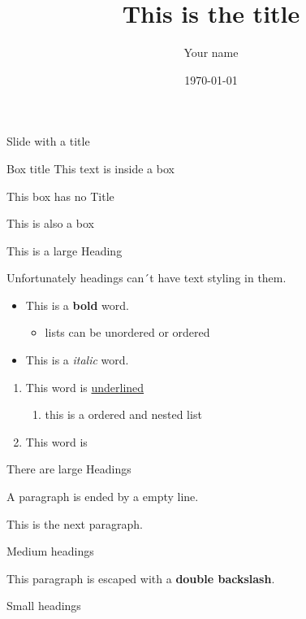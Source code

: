 \documentclass{beamer}
\title{This is the title}
\author{Your name}
\date{\today}
\begin{document}
\begin{frame}
\titlepage
\end{frame}

\begin{frame}{Slide with a title}



\begin{block}{Box title}
This text is inside a box
\end{block}

\begin{block}{}
This box has no Title
\end{block}

\begin{block}{}
This is also a box
\end{block}



\end{frame}
\begin{frame}{}


\Huge
This is a large Heading
\normalsize

Unfortunately headings can´t have text styling in them.

\begin{itemize}
\item This is a \textbf{bold} word.\begin{itemize}
\item lists can be unordered or ordered\end{itemize}\item This is a \textit{italic} word.
\end{itemize}

\begin{enumerate}
\item This word is \underline{underlined}
\begin{enumerate}
\item this is a ordered and nested list
\end{enumerate}
\item This word is 
\end{enumerate}

\end{frame}
\begin{frame}{}


\Huge
There are large Headings
\normalsize

A paragraph is ended by a empty line.

This is the next paragraph.

\Large
Medium headings
\normalsize

This paragraph is
escaped with a \textbf{double backslash}.

\footnotesize
Small headings
\normalsize


\end{frame}
\end{document}
